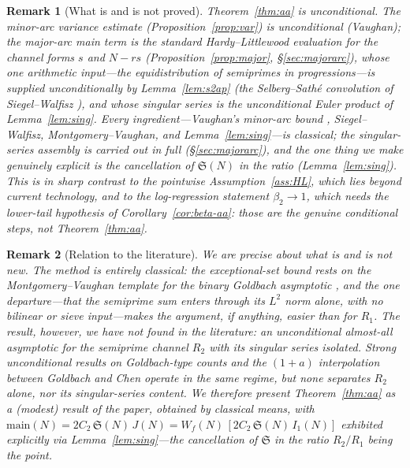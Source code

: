 \documentclass[]{interact}%
\newtheorem{remark}{Remark}
\newcommand{\sing}{\mathfrak S}
\begin{document}
\begin{remark}[What is and is not proved]
Theorem~\ref{thm:aa} is unconditional. The minor-arc variance estimate
(Proposition~\ref{prop:var}) is unconditional (Vaughan); the major-arc main term is the
standard Hardy--Littlewood evaluation for the channel forms $s$ and $N-rs$
(Proposition~\ref{prop:major}, \S\ref{sec:majorarc}), whose one arithmetic input---the
equidistribution of semiprimes in progressions---is supplied unconditionally by
Lemma~\ref{lem:s2ap} (the Selberg--Sath\'e convolution of Siegel--Walfisz
\citep{selberg1954,sathe1953}), and whose singular series is the \emph{unconditional}
Euler product of Lemma~\ref{lem:sing}. Every ingredient---Vaughan's minor-arc bound
\citep{vaughan1997}, Siegel--Walfisz, Montgomery--Vaughan, and Lemma~\ref{lem:sing}---is
classical; the singular-series assembly is carried out in full (\S\ref{sec:majorarc}), and the
one thing we make genuinely \emph{explicit} is the cancellation of $\sing(N)$ in the ratio
(Lemma~\ref{lem:sing}). This is in sharp contrast to the pointwise
Assumption~\ref{ass:HL}, which lies beyond current technology, and to the log-regression
statement $\beta_2\to1$, which needs the lower-tail hypothesis of Corollary~\ref{cor:beta-aa}:
those are the genuine conditional steps, not Theorem~\ref{thm:aa}.
\end{remark}

\begin{remark}[Relation to the literature]\label{rem:literature}
We are precise about what is and is not new. The \emph{method} is entirely classical: the
exceptional-set bound rests on the Montgomery--Vaughan template for the binary Goldbach asymptotic
\citep{montgomeryvaughan1975}, and the one departure---that the semiprime sum enters through its
$L^2$ norm alone, with no bilinear or sieve input---makes the argument, if anything, \emph{easier}
than for $R_1$. The \emph{result}, however, we have not found in the literature: an unconditional
almost-all asymptotic for the \emph{semiprime} channel $R_2$ with its singular series isolated.
Strong unconditional results on Goldbach-type counts and the $(1+a)$ interpolation between Goldbach
and Chen \citep{li2026} operate in the same regime, but none separates $R_2$ alone, nor its
singular-series content. We therefore present Theorem~\ref{thm:aa} as a (modest) result of the
paper, obtained by classical means, with
$\mathrm{main}(N)=2C_2\,\sing(N)\,J(N)=W_f(N)\,[2C_2\,\sing(N)\,I_1(N)]$ exhibited explicitly via
Lemma~\ref{lem:sing}---the cancellation of $\sing$ in the ratio $R_2/R_1$ being the point.
\end{remark}
\end{document}
